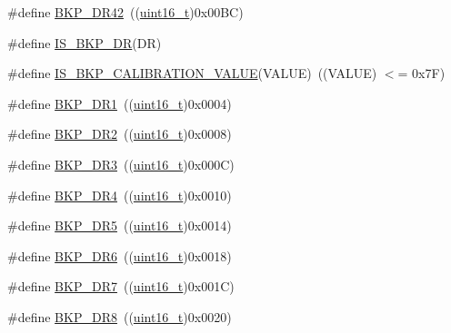 \begin{DoxyCompactItemize}
\item 
\#define \hyperlink{group___data___backup___register_ga557d35e490957616b02672005f516542}{B\+K\+P\+\_\+\+D\+R42}~((\hyperlink{_p_e___types_8h_a1f1825b69244eb3ad2c7165ddc99c956}{uint16\+\_\+t})0x00\+B\+C)
\item 
\#define \hyperlink{group___data___backup___register_gaff069cf5458ccf0a94e2f784e2d610b8}{I\+S\+\_\+\+B\+K\+P\+\_\+\+DR}(DR)
\item 
\#define \hyperlink{group___data___backup___register_gafc3386eaa5383b64e9d706e5fe8dc1cf}{I\+S\+\_\+\+B\+K\+P\+\_\+\+C\+A\+L\+I\+B\+R\+A\+T\+I\+O\+N\+\_\+\+V\+A\+L\+UE}(V\+A\+L\+UE)~((V\+A\+L\+UE) $<$= 0x7\+F)
\item 
\#define \hyperlink{group___data___backup___register_ga5d4c3eeaccafcfc0ee3b5dc01381bab0}{B\+K\+P\+\_\+\+D\+R1}~((\hyperlink{_p_e___types_8h_a1f1825b69244eb3ad2c7165ddc99c956}{uint16\+\_\+t})0x0004)
\item 
\#define \hyperlink{group___data___backup___register_ga73867f10a3ef17eeb0d3ace641f185ad}{B\+K\+P\+\_\+\+D\+R2}~((\hyperlink{_p_e___types_8h_a1f1825b69244eb3ad2c7165ddc99c956}{uint16\+\_\+t})0x0008)
\item 
\#define \hyperlink{group___data___backup___register_gadcc77540e016c6e8dffab223af35ae88}{B\+K\+P\+\_\+\+D\+R3}~((\hyperlink{_p_e___types_8h_a1f1825b69244eb3ad2c7165ddc99c956}{uint16\+\_\+t})0x000\+C)
\item 
\#define \hyperlink{group___data___backup___register_gab327f2365ef58f3163f7fe8fa7b3c56e}{B\+K\+P\+\_\+\+D\+R4}~((\hyperlink{_p_e___types_8h_a1f1825b69244eb3ad2c7165ddc99c956}{uint16\+\_\+t})0x0010)
\item 
\#define \hyperlink{group___data___backup___register_ga21191497b79eb37ab00a1564e060e5ca}{B\+K\+P\+\_\+\+D\+R5}~((\hyperlink{_p_e___types_8h_a1f1825b69244eb3ad2c7165ddc99c956}{uint16\+\_\+t})0x0014)
\item 
\#define \hyperlink{group___data___backup___register_ga9d84a78d9c99d57844cfc557f4c047b4}{B\+K\+P\+\_\+\+D\+R6}~((\hyperlink{_p_e___types_8h_a1f1825b69244eb3ad2c7165ddc99c956}{uint16\+\_\+t})0x0018)
\item 
\#define \hyperlink{group___data___backup___register_gaed1b548c12929fbfbc57548ec1316df0}{B\+K\+P\+\_\+\+D\+R7}~((\hyperlink{_p_e___types_8h_a1f1825b69244eb3ad2c7165ddc99c956}{uint16\+\_\+t})0x001\+C)
\item 
\#define \hyperlink{group___data___backup___register_gae6ed231677e748d838f37e7ab89e51ca}{B\+K\+P\+\_\+\+D\+R8}~((\hyperlink{_p_e___types_8h_a1f1825b69244eb3ad2c7165ddc99c956}{uint16\+\_\+t})0x0020)

\end{DoxyCompactItemize}
